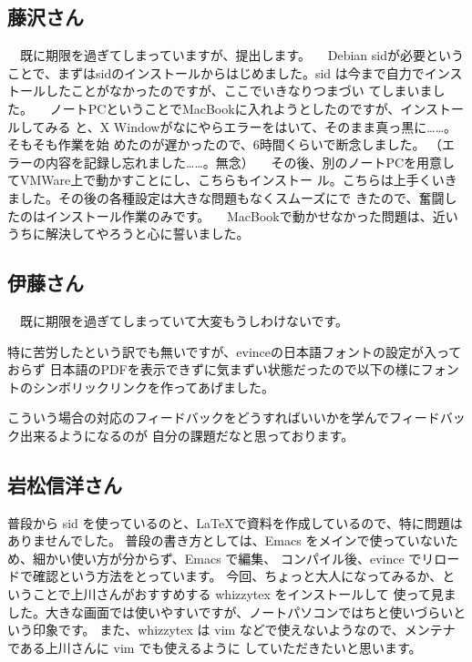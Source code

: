 \documentclass[mingoth,a4paper]{jsarticle}
\begin{document}
\subsection{藤沢さん}
　既に期限を過ぎてしまっていますが、提出します。
　Debian sidが必要ということで、まずはsidのインストールからはじめました。sid
は今まで自力でインストールしたことがなかったのですが、ここでいきなりつまづい
てしまいました。
　ノートPCということでMacBookに入れようとしたのですが、インストールしてみる
と、X Windowがなにやらエラーをはいて、そのまま真っ黒に……。そもそも作業を始
めたのが遅かったので、6時間くらいで断念しました。
（エラーの内容を記録し忘れました……。無念）
　その後、別のノートPCを用意してVMWare上で動かすことにし、こちらもインストー
ル。こちらは上手くいきました。その後の各種設定は大きな問題もなくスムーズにで
きたので、奮闘したのはインストール作業のみです。
　MacBookで動かせなかった問題は、近いうちに解決してやろうと心に誓いました。

\subsection{伊藤さん}
　既に期限を過ぎてしまっていて大変もうしわけないです。

特に苦労したという訳でも無いですが、evinceの日本語フォントの設定が入っておらず
日本語のPDFを表示できずに気まずい状態だったので以下の様にフォントのシンボリックリンクを作ってあげました。
こういう場合の対応のフィードバックをどうすればいいかを学んでフィードバック出来るようになるのが
自分の課題だなと思っております。


\subsection{岩松信洋さん}
普段から sid を使っているのと、\LaTeX で資料を作成しているので、特に問題はありませんでした。
普段の書き方としては、Emacs をメインで使っていないため、細かい使い方が分からず、Emacs で編集、
コンパイル後、evince でリロードで確認という方法をとっています。
今回、ちょっと大人になってみるか、ということで上川さんがおすすめする whizzytex をインストールして
使って見ました。大きな画面では使いやすいですが、ノートパソコンではちと使いづらいという印象です。
また、whizzytex は vim などで使えないようなので、メンテナである上川さんに vim でも使えるように
していただきたいと思います。
\end{document}
